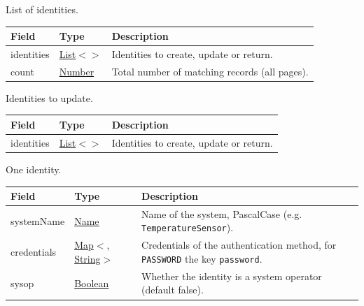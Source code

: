 \documentclass[a4paper]{arrowhead}
\newcommand{\mref}[2][]{{\textcolor{ArrowheadPurple}{\hyperref[sec:model:#2]{\ifstrempty{#1}{#2}{#1}}}}}
\newcommand{\pref}[1]{{\textcolor{ArrowheadGrey}{\hyperref[sec:model:primitives:#1]{#1}}}}
\begin{document}

List of identities.


\noindent\begin{tabularx}{\textwidth}{| >{\raggedright\arraybackslash}p{3.9cm} | >{\raggedright\arraybackslash\small}p{5.3cm} | X |} \hline
\rowcolor{gray!33} Field & Type & Description \\ \hline
identities & \pref{List}$<$\allowbreak{}\mref{IdentityMgmtResponse}$>$ & Identities to create, update or return. \\ \hline
count & \pref{Number} & Total number of matching records (all pages). \\ \hline
\end{tabularx}




Identities to update.


\noindent\begin{tabularx}{\textwidth}{| >{\raggedright\arraybackslash}p{3.9cm} | >{\raggedright\arraybackslash\small}p{5.3cm} | X |} \hline
\rowcolor{gray!33} Field & Type & Description \\ \hline
identities & \pref{List}$<$\allowbreak{}\mref{IdentityMgmtRequest}$>$ & Identities to create, update or return. \\ \hline
\end{tabularx}




One identity.


\noindent\begin{tabularx}{\textwidth}{| >{\raggedright\arraybackslash}p{3.9cm} | >{\raggedright\arraybackslash\small}p{5.3cm} | X |} \hline
\rowcolor{gray!33} Field & Type & Description \\ \hline
system\allowbreak{}Name & \pref{Name} & Name of the system, PascalCase (e.g. \texttt{TemperatureSensor}). \\ \hline
credentials & \pref{Map}$<$\allowbreak{}\pref{String}, \pref{String}$>$ & Credentials of the authentication method, for \texttt{PASSWORD} the key \texttt{password}. \\ \hline
sysop & \pref{Boolean} & Whether the identity is a system operator (default false). \\ \hline
\end{tabularx}
\end{document}
